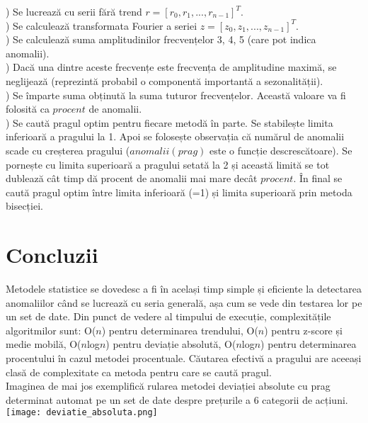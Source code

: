) Se lucrează cu serii fără trend $r = [r_0, r_1, ..., r_{n-1}]^T$.\\

) Se calculează transformata Fourier a seriei $z = [z_0, z_1, ..., z_{n-1}]^T$.\\

) Se calculează suma amplitudinilor frecvențelor 3, 4, 5 (care pot indica anomalii).\\

) Dacă una dintre aceste frecvențe este frecvența de amplitudine maximă, se neglijează 
(reprezintă probabil o componentă importantă a sezonalității).\\

) Se împarte suma obținută la suma tuturor frecvențelor. Această valoare va fi folosită ca $procent$ de anomalii.\\

) Se caută pragul optim pentru fiecare metodă în parte. Se stabilește limita inferioară a pragului la 1. Apoi se folosește observația că numărul de 
anomalii scade cu creșterea pragului ($anomalii(prag)$ este o funcție descrescătoare). Se pornește cu limita superioară a pragului setată la 2 și 
această limită se tot dublează cât timp dă procent de anomalii mai mare decât $procent$. În final se caută pragul optim între limita inferioară (=1) 
și limita superioară prin metoda bisecției.

\section{Concluzii}
\noindent Metodele statistice se dovedesc a fi în același timp simple și eficiente la detectarea anomaliilor când se lucrează cu seria generală, așa 
cum se vede din testarea lor pe un set de date. Din punct de vedere al timpului de execuție, complexitățile algoritmilor sunt: O($n$) pentru 
determinarea trendului, O($n$) pentru z-score și medie mobilă, O($n$log$n$) pentru deviație absolută, O($n$log$n$) pentru determinarea procentului în 
cazul metodei procentuale. Căutarea efectivă a pragului are aceeași clasă de complexitate ca metoda pentru care se caută pragul. \\

\noindent Imaginea de mai jos exemplifică rularea metodei deviației absolute cu prag determinat automat pe un set de date despre prețurile a 6 categorii de acțiuni.\\
\texttt{[image: deviatie\_absoluta.png]}

